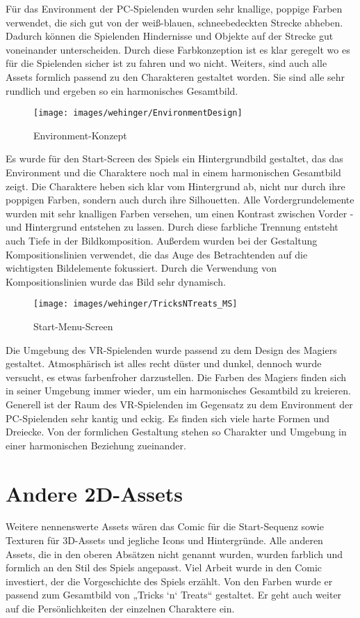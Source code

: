 Für das Environment der PC-Spielenden wurden sehr knallige, poppige Farben verwendet, die sich gut von der weiß-blauen, schneebedeckten Strecke abheben. Dadurch können die Spielenden Hindernisse und Objekte auf der Strecke gut voneinander unterscheiden. Durch diese Farbkonzeption ist es klar geregelt wo es für die Spielenden sicher ist zu fahren und wo nicht. Weiters, sind auch alle Assets formlich passend zu den Charakteren gestaltet worden. Sie sind alle sehr rundlich und ergeben so ein harmonisches Gesamtbild.

\begin{figure}[H]
	\centering
	\texttt{[image: images/wehinger/EnvironmentDesign]}
	\caption{Environment-Konzept}
\end{figure}

Es wurde für den Start-Screen des Spiels ein Hintergrundbild gestaltet, das das Environment und die Charaktere noch mal in einem harmonischen Gesamtbild zeigt. Die Charaktere heben sich klar vom Hintergrund ab, nicht nur durch ihre poppigen Farben, sondern auch durch ihre Silhouetten. Alle Vordergrundelemente wurden mit sehr knalligen Farben versehen, um einen Kontrast zwischen Vorder -und Hintergrund entstehen zu lassen. Durch diese farbliche Trennung entsteht auch Tiefe in der Bildkomposition. Außerdem wurden bei der Gestaltung Kompositionslinien verwendet, die das Auge des Betrachtenden auf die wichtigsten Bildelemente fokussiert. Durch die Verwendung von Kompositionslinien wurde das Bild sehr dynamisch.

\begin{figure}[H]
	\centering
	\texttt{[image: images/wehinger/TricksNTreats\_MS]}
	\caption{Start-Menu-Screen}
\end{figure}

Die Umgebung des VR-Spielenden wurde passend zu dem Design des Magiers gestaltet. Atmosphärisch ist alles recht düster und dunkel, dennoch wurde versucht, es etwas farbenfroher darzustellen. Die Farben des Magiers finden sich in seiner Umgebung immer wieder, um ein harmonisches Gesamtbild zu kreieren. Generell ist der Raum des VR-Spielenden im Gegensatz zu dem Environment der PC-Spielenden sehr kantig und eckig. Es finden sich viele harte Formen und Dreiecke. Von der formlichen Gestaltung stehen so Charakter und Umgebung in einer harmonischen Beziehung zueinander.

\section{Andere 2D-Assets}
Weitere nennenswerte Assets wären das Comic für die Start-Sequenz sowie Texturen für 3D-Assets und jegliche Icons und Hintergründe. Alle anderen Assets, die in den oberen Absätzen nicht genannt wurden, wurden farblich und formlich an den Stil des Spiels angepasst. 
Viel Arbeit wurde in den Comic investiert, der die Vorgeschichte des Spiels erzählt. Von den Farben wurde er passend zum Gesamtbild von „Tricks ‘n‘ Treats“ gestaltet. Er geht auch weiter auf die Persönlichkeiten der einzelnen Charaktere ein.


